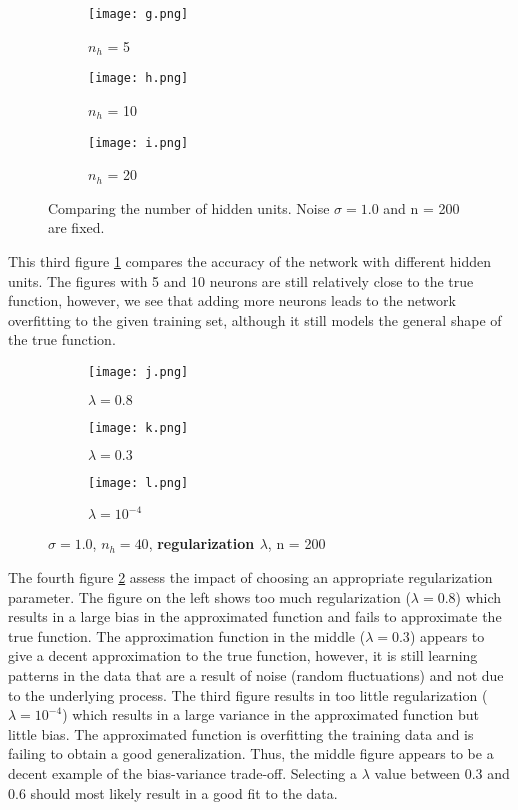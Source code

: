 \documentclass[paper=a4, fontsize=11pt]{scrartcl} %
\numberwithin{equation}{section} %
\begin{document}
\begin{figure}[ht]
\centering
	\begin{subfigure}[b]{0.3\textwidth}
	\centering
	\texttt{[image: g.png]}
	\caption{$n_h$ = 5}
	\end{subfigure}
\begin{subfigure}[b]{0.3\textwidth}
	\centering
	\texttt{[image: h.png]}
	\caption{$n_h$ = 10}
	\end{subfigure}
\begin{subfigure}[b]{0.3\textwidth}
	\centering
	\texttt{[image: i.png]}
	\caption{$n_h$ = 20}
	\end{subfigure}
\caption{Comparing the number of hidden units. Noise $\sigma=1.0$ and n = 200 are fixed.}
\label{nhidden}
\end{figure}

This third figure \ref{nhidden} compares the accuracy of the network with different hidden units. The figures with 5 and 10 neurons are still relatively close to the true function, however, we see that adding more neurons leads to the network overfitting to the given training set, although it still models the general shape of the true function.\\

\begin{figure}[ht]
\centering
	\begin{subfigure}[b]{0.3\textwidth}
	\centering
	\texttt{[image: j.png]}
	\caption{$\lambda = 0.8$}
	\end{subfigure}
\begin{subfigure}[b]{0.3\textwidth}
	\centering
	\texttt{[image: k.png]}
	\caption{$\lambda = 0.3$}
	\end{subfigure}
\begin{subfigure}[b]{0.3\textwidth}
	\centering
	\texttt{[image: l.png]}
	\caption{$\lambda = 10^{-4}$}
	\end{subfigure}
\caption{$\sigma=1.0$, $n_h = 40$, \textbf{regularization $\lambda$}, n = 200}
\label{regular}
\end{figure}

The fourth figure \ref{regular} assess the impact of choosing an appropriate regularization parameter. The figure on the left shows too much regularization ($\lambda=0.8$) which results in a large bias in the approximated function and fails to approximate the true function. The approximation function in the middle ($\lambda=0.3$) appears to give a decent approximation to the true function, however, it is still learning patterns in the data that are a result of noise (random fluctuations) and not due to the underlying process. The third figure results in too little regularization ($\lambda = 10^{-4}$) which results in a large variance in the approximated function but little bias. The approximated function is overfitting the training data and is failing to obtain a good generalization. Thus, the middle figure appears to be a decent example of the bias-variance trade-off. Selecting a $\lambda$ value between 0.3 and 0.6 should most likely result in a good fit to the data.\\
\end{document}
